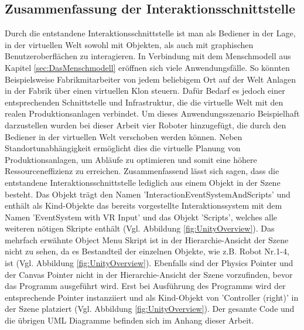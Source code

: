 \subsection{Zusammenfassung der Interaktionsschnittstelle}\label{sec:ZusammenfassungInteraktion}
Durch die entstandene Interaktionsschnittstelle ist man als Bediener in der Lage, in der virtuellen Welt sowohl mit Objekten, als auch mit graphischen Benutzeroberflächen zu interagieren. In Verbindung mit dem Menschmodell aus Kapitel \ref{sec:DasMenschmodell} eröffnen sich viele Anwendungsfälle. So könnten Beispielsweise Fabrikmitarbeiter von jedem beliebigem Ort auf der Welt Anlagen in der Fabrik über einen virtuellen Klon steuern. Dafür Bedarf es jedoch einer entsprechenden Schnittstelle und Infrastruktur, die die virtuelle Welt mit den realen Produktionsanlagen verbindet. Um dieses Anwendungsszenario Beispielhaft darzustellen wurden bei dieser Arbeit vier Roboter hinzugefügt, die durch den Bediener in der virtuellen Welt verschoben werden können. Neben Standortunabhängigkeit ermöglicht dies die virtuelle Planung von Produktionsanlagen, um Abläufe zu optimieren und somit eine höhere Ressourceneffizienz zu erreichen.
\newline
Zusammenfassend lässt sich sagen, dass die entstandene Interaktionsschnittstelle lediglich aus einem Objekt in der Szene besteht. Das Objekt trägt den Namen 'InteractionEventSystemAndScripts' und enthält als Kind-Objekte das bereits vorgestellte Interaktionssystem mit dem Namen 'EventSystem with VR Input' und das Objekt 'Scripts', welches alle weiteren nötigen Skripte enthält (Vgl. Abbildung \ref{fig:UnityOverview}). Das mehrfach erwähnte Object Menu Skript ist in der Hierarchie-Ansicht der Szene nicht zu sehen, da es Bestandteil der einzelnen Objekte, wie z.B. Robot Nr.1-4, ist (Vgl. Abbildung \ref{fig:UnityOverview}). Ebenfalls sind der Physics Pointer und der Canvas Pointer nicht in der Hierarchie-Ansicht der Szene vorzufinden, bevor das Programm ausgeführt wird. Erst bei Ausführung des Programms wird der entsprechende Pointer instanziiert und als Kind-Objekt von 'Controller (right)' in der Szene platziert (Vgl. Abbildung \ref{fig:UnityOverview}).
\newline
Der gesamte Code und die übrigen UML Diagramme befinden sich im Anhang dieser Arbeit.